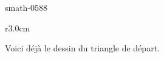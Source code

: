 
\begin{corrige}{smath-0588}

\begin{wrapfigure}{r}{3.0cm}
   \vspace{-0.5cm}        %
   \centering
   
\end{wrapfigure}

Voici déjà le dessin du triangle de départ.

\end{corrige}
